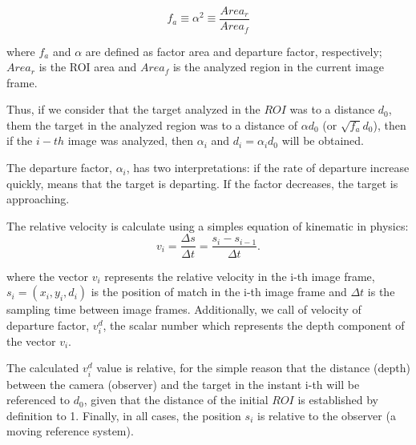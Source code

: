 \begin{equation}\label{eq:relarea}
f_a \equiv \alpha^2 \equiv \frac{Area_r}{Area_f} 
\end{equation}

where $f_a$ and $\alpha$ are defined as factor area and departure factor, 
respectively; $Area_r$ is the ROI area and $Area_f$ 
is the analyzed region in the current image frame. 

Thus, if we consider that the target analyzed in the $ROI$ was to a distance $d_0$,
them the target in the analyzed region was to a distance of $\alpha d_0$ (or $\sqrt{f_a} d_0$),
then if the $i-th$ image was analyzed, then $\alpha_i$ and $d_i=\alpha_i d_0$ will be obtained.

The departure factor, $\alpha_i$, has two interpretations: if the rate of departure increase quickly, 
means that the target is departing. If the factor decreases, the 
target is approaching.

The relative velocity is calculate using a simples equation of kinematic in physics:
\begin{equation}
 v_i = \frac{\Delta s}{\Delta t}= \frac{s_i-s_{i-1}}{\Delta t}.
\end{equation}

where the vector $v_i$ represents the relative velocity in the i-th image frame, 
$s_i=(x_i,y_i,d_i)$ is the position of match in the i-th image frame
and $\Delta t$ is the sampling time between image frames.
Additionally, we call of velocity of departure factor, $v^d_i$, 
the scalar number which represents the depth component
of the vector $v_i$.

The calculated  $v^d_i$ value is relative, for the simple reason that the distance (depth) between the 
camera (observer) and the target in the instant i-th will be referenced to $d_0$, 
given that the distance of the initial $ROI$ is established by definition to 1.
Finally, in all cases, the position $s_i$ is relative to the observer (a moving reference system).

